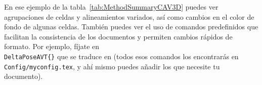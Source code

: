En ese ejemplo de la tabla~\ref{tab:MethodSummaryCAV3D} puedes ver agrupaciones de celdas y alineamientos variados, así como cambios en el color de fondo de algunas celdas. También puedes ver el uso de comandos predefinidos que facilitan la consistencia de los documentos y permiten cambios rápidos de formato. Por ejemplo, fíjate en \texttt{\\DeltaPoseAVT\{\}} que se traduce en \DeltaPoseAVT{} (todos esos comandos los encontrarás en \texttt{Config/myconfig.tex}, y ahí mismo puedes añadir los que necesite tu documento).

\begin{table}[h]
  \centering
\end{table}
